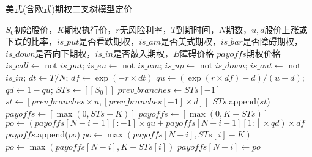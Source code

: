 \documentclass[11pt]{ctexart}
\begin{document}
    \begin{algorithm}
        \caption{美式(含欧式)期权二叉树模型定价}
        \begin{algorithmic}[1] %
            \Require $S_0$初始股价，$K$期权执行价，$r$无风险利率，$T$到期时间，$N$期数，$u,d$股价上涨或下跌的比率，$is\_put$是否看跌期权，$is\_am$是否美式期权，$is\_bar$是否障碍期权，$is\_down$是否向下期权，$is\_in$是否敲入期权，$B$障碍价格
            \Ensure $payoffs$期权价格
                \State $is\_call \gets$ not $is\_put$; $is\_eu \gets$ not $is\_am$;
                \State $is\_up \gets$ not $is\_down$; $is\_out \gets$ not $is\_in$;
                \State $dt \gets T/N$; $df \gets \exp(-r \times dt)$
            \EndFunction
            \State
                \State $qu \gets (\exp(r \times df) - d) / (u-d)$; $qd \gets 1-qu$; $STs \gets [[S_0]]$
                    \State $prev\_branches \gets STs[-1]$
                    \State $st \gets [prev\_branches \times u, [prev\_branches[-1] \times d]]$
                    \State $STs$.append($st$)
                \EndFor
                    \State $payoffs \gets [\max(0, STs - K)]$
                \Else
                    \State $payoffs \gets [\max(0, K - STs)]$
                \EndIf
                    \State $po \gets (payoffs[N-i-1][:-1]\times qu + payoffs[N-i-1][1:]\times qd) \times df$
                    \State $payoffs$.append($po$)
                            \State $po \gets \max(payoffs[N-i], STs[i] - K)$
                        \Else
                            \State $po \gets \max(payoffs[N-i], K - STs[i])$
                        \EndIf
                        \State $payoffs[N-i] \gets po$
                    \EndIf
                \EndFor\\
            \EndFunction
        \end{algorithmic}
    \end{algorithm}
\end{document}
